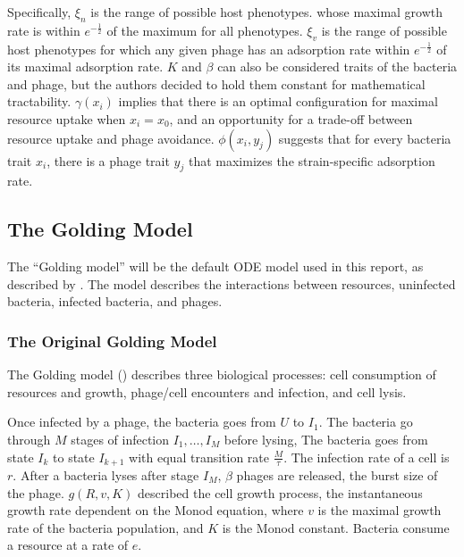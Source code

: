 Specifically, $\xi_n$ is the range of possible host phenotypes. 
whose maximal growth rate is within $e^{-\frac{1}{2}}$ of the maximum for all phenotypes. 
$\xi_v$ is the range of possible host phenotypes for which any given phage has an adsorption rate within $e^{-\frac{1}{2}}$ of its maximal adsorption rate. 
$K$ and $\beta$ can also be considered traits of the bacteria and phage, but the authors decided to hold them constant for mathematical tractability. 
$\gamma(x_i)$ implies that there is an optimal configuration for maximal resource uptake when $ x_i = x_0$, and an opportunity for a trade-off between resource uptake and phage avoidance. 
$\phi(x_i, y_j)$ suggests that for every bacteria trait $x_i$, there is a phage trait $y_j$ that maximizes the strain-specific adsorption rate. 

\subsection{The Golding Model}
\label{sec:golding_model}
The “Golding model” will be the default ODE model used in this report, as described by \citet{gengUsingBacterialPopulation2024}. 
The model describes the interactions between resources, uninfected bacteria, infected bacteria, and phages. 

\subsubsection{The Original Golding Model}
The Golding model () describes three biological processes: cell consumption of resources and growth, phage/cell encounters and infection, and cell lysis. 

Once infected by a phage, the bacteria goes from $U$ to $I_1$. 
The bacteria go through $M$ stages of infection $I_1, \dots, I_M$ before lysing, 
The bacteria goes from state $I_k$ to state $I_{k+1}$ with equal transition rate $\frac{M}{\tau}$. 
The infection rate of a cell is $r$. 
After a bacteria lyses after stage $I_M$, $\beta$ phages are released, the burst size of the phage. 
$g(R, v, K)$ described the cell growth process, the instantaneous growth rate dependent on the Monod equation, where $v$ is the maximal growth rate of the bacteria population, and $K$ is the Monod constant. 
Bacteria consume a resource at a rate of $e$. 

